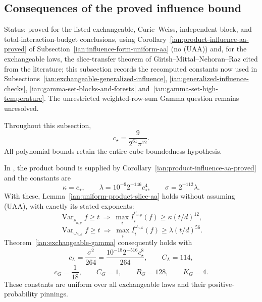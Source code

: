 \subsection{Consequences of the proved influence bound}
\label{ian:influence-form-consequences}

Status: proved for the listed exchangeable, Curie--Weiss, independent-block, and total-interaction-budget conclusions, using Corollary~\ref{ian:product-influence-aa-proved} of Subsection~\ref{ian:influence-form-uniform-aa} (no (UAA)) and, for the exchangeable laws, the slice-transfer theorem of Girish--Mittal--Nehoran--Raz cited from the literature; this subsection records the recomputed constants now used in Subsections~\ref{ian:exchangeable-generalized-influence}, \ref{ian:generalized-influence-checks}, \ref{ian:gamma-set-blocks-and-forests} and~\ref{ian:gamma-set-high-temperature}. The unrestricted weighted-row-sum Gamma question remains unresolved.

Throughout this subsection,
\[
 c_\star=\frac{9}{2^{61}\pi^{12}}.
\]
All polynomial bounds retain the entire-cube boundedness hypothesis.

\begin{proposition}
\label{ian:influence-consequences-exchangeable}
In , the product
bound is supplied by Corollary~\ref{ian:product-influence-aa-proved}
and the constants are
\[
 \kappa=c_\star,\qquad
 \lambda=10^{-9}2^{-146}c_\star^4,\qquad
 \sigma=2^{-112}\lambda.
 \tag{EC}
\]
With these, Lemma~\ref{ian:uniform-product-slice-aa} holds without
assuming (UAA), with exactly its stated exponents:
\[
 \operatorname{Var}_{\rho_{n,p}}f\ge t
 \ \Longrightarrow\
 \max_i I_i^{\rho_{n,p}}(f)\ge\kappa(t/d)^{12},
\]
\[
 \operatorname{Var}_{\omega_{n,k}}f\ge t
 \ \Longrightarrow\
 \max_i I_i^{\omega_{n,k}}(f)\ge\lambda(t/d)^{56}.
\]
Theorem~\ref{ian:exchangeable-gamma} consequently holds with
\[
 c_L=\frac{\sigma^2}{264}
     =\frac{10^{-18}2^{-516}c_\star^8}{264},
 \qquad C_L=114,
\]
\[
 c_G=\frac1{18},\qquad C_G=1,\qquad B_G=128,\qquad K_G=4.
\]
These constants are uniform over all exchangeable laws and their
positive-probability pinnings.
\end{proposition}

